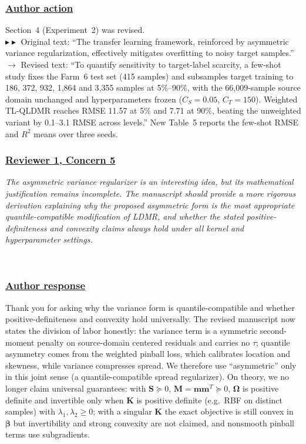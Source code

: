 \documentclass[journal,12pn, onecolumn]{IEEEtran}
\begin{document}
{{{{{{{{{{{\color{black}
\subsubsection*{\textbf{\underline{Author action}}}
Section~4 (Experiment~2) was revised.\\
$\blacktriangleright\blacktriangleright$ Original text: ``The transfer learning framework, reinforced by asymmetric variance regularization, effectively mitigates overfitting to noisy target samples.''\\
$\longrightarrow$ Revised text: ``{\color{blue}To quantify sensitivity to target-label scarcity, a few-shot study fixes the Farm~6 test set (415 samples) and subsamples target training to 186, 372, 932, 1{,}864 and 3{,}355 samples at 5\%--90\%, with the 66{,}009-sample source domain unchanged and hyperparameters frozen ($C_S=0.05$, $C_T=150$). Weighted TL-QLDMR reaches RMSE 11.57 at 5\% and 7.71 at 90\%, beating the unweighted variant by 0.1--3.1 RMSE across levels.}'' New Table~5 reports the few-shot RMSE and $R^2$ means over three seeds.
\textcolor{customgreen}{
\subsubsection*{\underline{\textbf{Reviewer 1, Concern 5}}}
\emph{The asymmetric variance regularizer is an interesting idea, but its mathematical justification remains incomplete. The manuscript should provide a more rigorous derivation explaining why the proposed asymmetric form is the most appropriate quantile-compatible modification of LDMR, and whether the stated positive-definiteness and convexity claims always hold under all kernel and hyperparameter settings.}
}\\

{\color{black}
\subsubsection*{\textbf{\underline{Author response}}}
Thank you for asking why the variance form is quantile-compatible and whether positive-definiteness and convexity hold universally. The revised manuscript now states the division of labor honestly: the variance term is a symmetric second-moment penalty on source-domain centered residuals and carries no $\tau$; quantile asymmetry comes from the weighted pinball loss, which calibrates location and skewness, while variance compresses spread. We therefore use ``asymmetric'' only in this joint sense (a quantile-compatible spread regularizer). On theory, we no longer claim universal guarantees: with $\mathbf{S}\succeq 0$, $\mathbf{M}=\mathbf{m}\mathbf{m}^T\succeq 0$, $\boldsymbol{\Omega}$ is positive definite and invertible only when $\boldsymbol{K}$ is positive definite (e.g.\ RBF on distinct samples) with $\lambda_1,\lambda_2\ge 0$; with a singular $\boldsymbol{K}$ the exact objective is still convex in $\boldsymbol{\beta}$ but invertibility and strong convexity are not claimed, and nonsmooth pinball terms use subgradients.

}}}}}}}}}}}}
\end{document}
